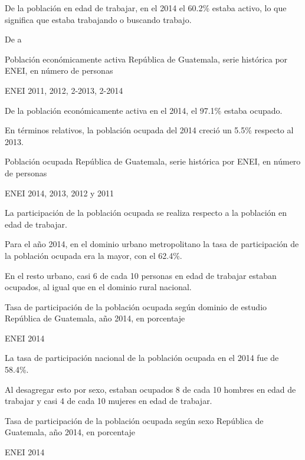  
 
 {%
 De la población en edad de trabajar, en el 2014 el 60.2\% estaba activo, lo que significa que estaba trabajando o buscando trabajo.
 
 De a}%
 {%
 	Población económicamente activa} %
 {%
 	República de Guatemala, serie histórica por ENEI, en número de personas} %
 {%
 	\begin{tikzpicture}[x=1pt,y=1pt]    \end{tikzpicture}}%
 {%
 	ENEI 2011, 2012, 2-2013, 2-2014} %
 
 
  
  {%
 De la población económicamente activa en el 2014, el 97.1\% estaba ocupado.
 
 En términos relativos, la población ocupada del 2014 creció un 5.5\% respecto al 2013.}%
  {%
  	Población ocupada} %
  {%
  	República de Guatemala, serie histórica por ENEI, en número de personas} %
  {%
  	\begin{tikzpicture}[x=1pt,y=1pt]    \end{tikzpicture}}%
  {%
  	ENEI 2014, 2013, 2012 y 2011} %
  
  
  
  
  {%
La participación de la población ocupada se realiza respecto a la población en edad de trabajar.

Para el año 2014, en el dominio urbano metropolitano la tasa de participación de la población ocupada era la mayor, con el 62.4\%. 

En el resto urbano, casi 6 de cada 10 personas en edad de trabajar estaban ocupados, al igual que en el dominio rural nacional. }%
  {%
  	Tasa de participación de la población ocupada según dominio de estudio} %
  {%
  	República de Guatemala, año 2014, en porcentaje} %
  {%
  	\begin{tikzpicture}[x=1pt,y=1pt]    \end{tikzpicture}}%
  {%
  	ENEI 2014} %
  
  
 
 {%
 La tasa de participación nacional de la población ocupada en el 2014 fue de 58.4\%.
 
 Al desagregar esto por sexo, estaban ocupados 8 de cada 10 hombres en edad de trabajar y casi 4 de cada 10 mujeres en edad de trabajar.}%
 {%
 	Tasa de participación de la población ocupada según sexo} %
 {%
 	República de Guatemala, año 2014, en porcentaje} %
 {%
 	\begin{tikzpicture}[x=1pt,y=1pt]    \end{tikzpicture}}%
 {%
 	ENEI 2014} %
 
